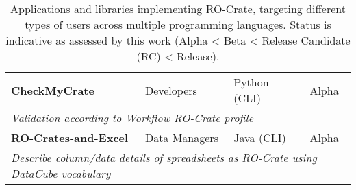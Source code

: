 \begin{table}[htbp]
\begin{tabular}{llll}
        \textbf{CheckMyCrate} \citep{CheckMyCrate} & Developers & Python (CLI) & Alpha \\
        \multicolumn{4}{l}{\it Validation according to Workflow RO-Crate profile} \\

        \textbf{RO-Crates-and-Excel} \citep{doi:10.5281/zenodo.5068950} & Data Managers & Java (CLI) & Alpha \\
        \multicolumn{4}{l}{\it Describe column/data details of spreadsheets as RO-Crate using DataCube vocabulary} \\

    
		\bottomrule
	\end{tabular}
	\caption{Applications and libraries implementing RO-Crate, targeting different types of users across multiple programming languages. Status is indicative as assessed by this work (Alpha < Beta < Release Candidate (RC) < Release).}
	\label{tab:tools}
\end{table}